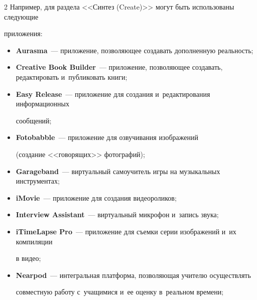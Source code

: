 \begin{multicols}{2}
  Например, для раздела <<Синтез (Create)>> могут быть использованы следующие


приложения:


  \begin{itemize}


\item \textbf{Aurasma}~--- приложение, позволяющее создавать дополненную реальность;


\item \textbf{Creative Book Builder}~--- приложение, позволяющее создавать, редактировать и~публиковать книги;


\item \textbf{Easy Release}~--- приложение для создания и~редактирования информационных


сообщений;


\item \textbf{Fotobabble}~--- приложение для озвучивания изображений


(создание <<говорящих>> фотографий);


\item \textbf{Garageband}~--- виртуальный самоучитель игры на музыкальных инструментах;


\item \textbf{iMovie}~--- приложение для создания видеороликов;


\item \textbf{Interview Assistant}~--- виртуальный микрофон и~запись звука;


\item \textbf{iTimeLapse Pro}~--- приложение для съемки серии изображений и~их компиляции


в видео;


\item \textbf{Nearpod}~--- интегральная платформа, поз\-во\-ля\-ющая учителю осуществлять


совместную работу с~учащимися и~ее оценку в~реальном времени;


\end{itemize}





\end{multicols}





